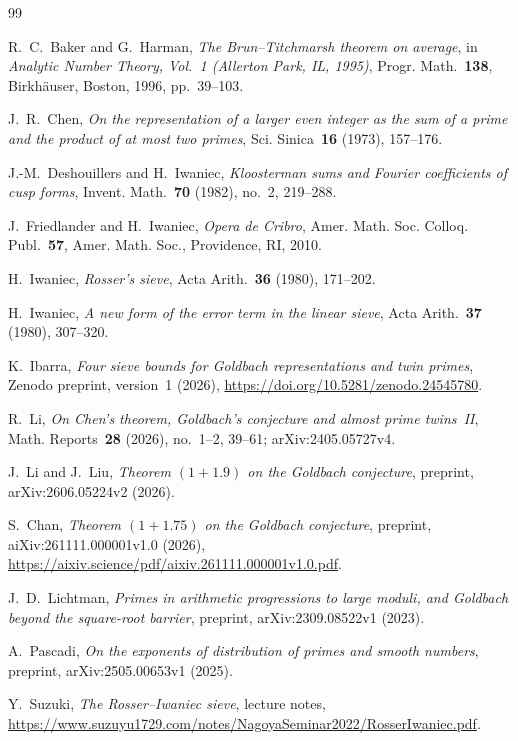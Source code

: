 \documentclass[11pt,reqno]{amsart}
\theoremstyle{remark}
\numberwithin{equation}{section}
\begin{document}
\begin{thebibliography}{99}

R.~C.~Baker and G.~Harman,
\emph{The Brun--Titchmarsh theorem on average},
in \emph{Analytic Number Theory, Vol.~1 (Allerton Park, IL, 1995)},
Progr. Math.~\textbf{138}, Birkh\"auser, Boston, 1996, pp.~39--103.

J.~R.~Chen,
\emph{On the representation of a larger even integer as the sum of a prime and the product of at most two primes},
Sci. Sinica~\textbf{16} (1973), 157--176.

J.-M.~Deshouillers and H.~Iwaniec,
\emph{Kloosterman sums and Fourier coefficients of cusp forms},
Invent. Math.~\textbf{70} (1982), no.~2, 219--288.

J.~Friedlander and H.~Iwaniec,
\emph{Opera de Cribro},
Amer. Math. Soc. Colloq. Publ.~\textbf{57}, Amer. Math. Soc., Providence, RI, 2010.

H.~Iwaniec,
\emph{Rosser's sieve},
Acta Arith.~\textbf{36} (1980), 171--202.

H.~Iwaniec,
\emph{A new form of the error term in the linear sieve},
Acta Arith.~\textbf{37} (1980), 307--320.

K.~Ibarra,
\emph{Four sieve bounds for Goldbach representations and twin primes},
Zenodo preprint, version~1 (2026), \url{https://doi.org/10.5281/zenodo.24545780}.

R.~Li,
\emph{On Chen's theorem, Goldbach's conjecture and almost prime twins~II},
Math. Reports~\textbf{28} (2026), no.~1--2, 39--61; arXiv:2405.05727v4.

J.~Li and J.~Liu,
\emph{Theorem $(1+1.9)$ on the Goldbach conjecture},
preprint, arXiv:2606.05224v2 (2026).

S.~Chan,
\emph{Theorem $(1+1.75)$ on the Goldbach conjecture},
preprint, aiXiv:261111.000001v1.0 (2026),
\url{https://aixiv.science/pdf/aixiv.261111.000001v1.0.pdf}.

J.~D.~Lichtman,
\emph{Primes in arithmetic progressions to large moduli, and Goldbach beyond the square-root barrier},
preprint, arXiv:2309.08522v1 (2023).

A.~Pascadi,
\emph{On the exponents of distribution of primes and smooth numbers},
preprint, arXiv:2505.00653v1 (2025).

Y.~Suzuki, \emph{The Rosser--Iwaniec sieve}, lecture notes,
\url{https://www.suzuyu1729.com/notes/NagoyaSeminar2022/RosserIwaniec.pdf}.

\end{thebibliography}
\end{document}
